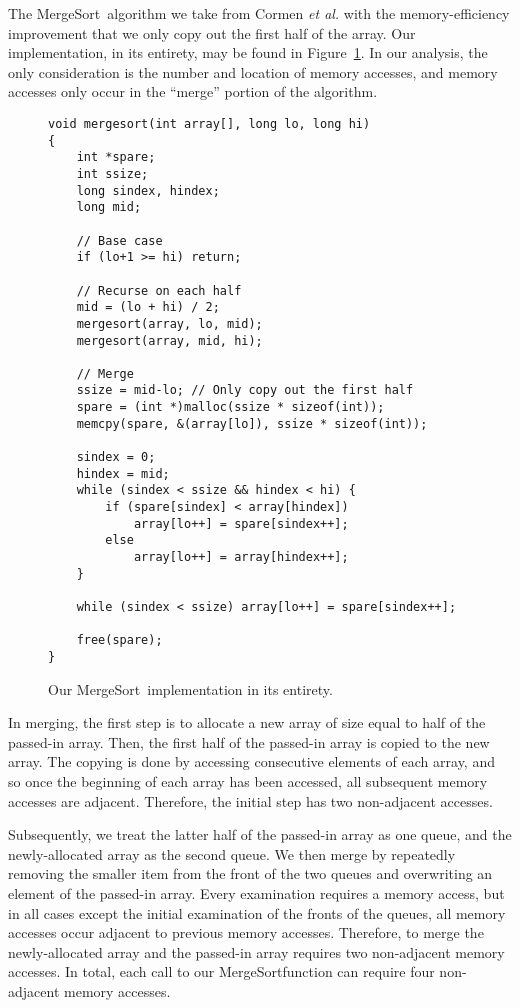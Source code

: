 \documentclass[11pt]{article}
\newcommand{\mergesort}{{\sc MergeSort}}
\begin{document}
The \mergesort\ algorithm we take from Cormen {\it et al.}\cite{clrs} with the
memory-efficiency improvement that we only copy out the first half of the
array.  Our implementation, in its entirety, may be found in
Figure~\ref{fig:msort}.  In our analysis, the only consideration is the number
and location of memory accesses, and memory accesses only occur in the
``merge'' portion of the algorithm.

\begin{figure}
\begin{verbatim}
void mergesort(int array[], long lo, long hi)
{
    int *spare;
    int ssize;
    long sindex, hindex;
    long mid;

    // Base case
    if (lo+1 >= hi) return; 

    // Recurse on each half
    mid = (lo + hi) / 2;  
    mergesort(array, lo, mid);
    mergesort(array, mid, hi);

    // Merge
    ssize = mid-lo; // Only copy out the first half
    spare = (int *)malloc(ssize * sizeof(int));
    memcpy(spare, &(array[lo]), ssize * sizeof(int));

    sindex = 0;
    hindex = mid;
    while (sindex < ssize && hindex < hi) {
        if (spare[sindex] < array[hindex])
            array[lo++] = spare[sindex++];
        else
            array[lo++] = array[hindex++];
    }

    while (sindex < ssize) array[lo++] = spare[sindex++];

    free(spare);
}
\end{verbatim}


\caption{Our \mergesort\ implementation in its entirety.}
\label{fig:msort}
\end{figure}

In merging, the first step is to allocate a new array of size equal to half of
the passed-in array.  Then, the first half of the passed-in array is copied to
the new array.  The copying is done by accessing consecutive elements of each
array, and so once the beginning of each array has been accessed, all subsequent memory accesses are adjacent.  Therefore, the initial step has two non-adjacent accesses.

Subsequently, we treat the latter half of the passed-in array as one queue, and the newly-allocated array as the second queue.  We then merge by repeatedly removing the smaller item from the front of the two queues and overwriting an element of the passed-in array.  Every examination requires a memory access, but in all cases except the initial examination of the fronts of the queues, all memory accesses occur adjacent to previous memory accesses.  Therefore, to merge the newly-allocated array and the passed-in array requires two non-adjacent memory accesses.  In total, each call to our \mergesort function can require four non-adjacent memory accesses.
\end{document}

